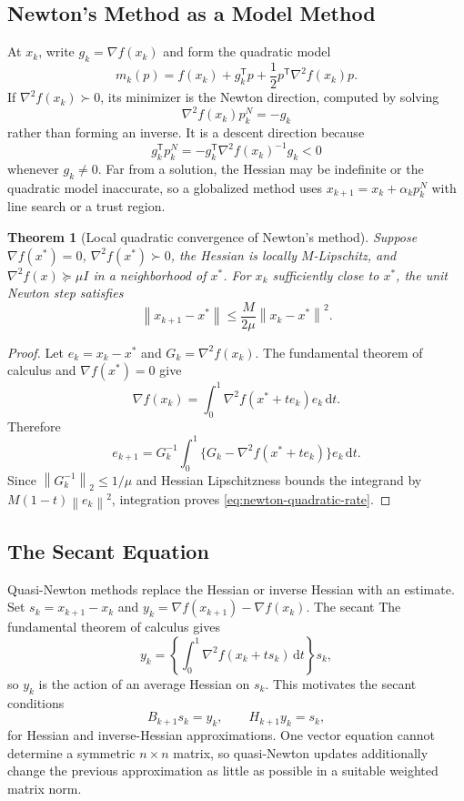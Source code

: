 \documentclass[12pt,oneside]{book}
\numberwithin{equation}{section}
\theoremstyle{definition}
\theoremstyle{plain}
\newtheorem{theorem}{Theorem}[section]
\theoremstyle{remark}
\newcommand{\norm}[1]{\left\lVert #1 \right\rVert}
\newcommand{\dd}{\,\mathrm{d}}
\newcommand{\grad}{\nabla}
\newcommand{\Hess}{\nabla^2}
\begin{document}
\subsection{Newton's Method as a Model Method}

At $x_k$, write $g_k=\grad f(x_k)$ and form the quadratic model
\[
 m_k(p)=f(x_k)+g_k^\mathsf Tp+\frac12p^\mathsf T\Hess f(x_k)p.
\]
If $\Hess f(x_k)\succ0$, its minimizer is the Newton direction, computed by
solving
\begin{equation}
 \Hess f(x_k)p_k^N=-g_k
 \label{eq:newton-system}
\end{equation}
rather than forming an inverse. It is a descent direction because
\[
 g_k^\mathsf Tp_k^N
 =-g_k^\mathsf T\Hess f(x_k)^{-1}g_k<0
\]
whenever $g_k\neq0$. Far from a solution, the Hessian may be indefinite or
the quadratic model inaccurate, so a globalized method uses
$x_{k+1}=x_k+\alpha_kp_k^N$ with line search or a trust region.

\begin{theorem}[Local quadratic convergence of Newton's method]
Suppose $\grad f(x^*)=0$, $\Hess f(x^*)\succ0$, the Hessian is locally
$M$-Lipschitz, and $\Hess f(x)\succeq\mu I$ in a neighborhood of $x^*$.
For $x_k$ sufficiently close to $x^*$, the unit Newton step satisfies
\begin{equation}
 \norm{x_{k+1}-x^*}
 \leq\frac{M}{2\mu}\norm{x_k-x^*}^2.
 \label{eq:newton-quadratic-rate}
\end{equation}
\end{theorem}

\begin{proof}
Let $e_k=x_k-x^*$ and $G_k=\Hess f(x_k)$. The fundamental theorem of calculus
and $\grad f(x^*)=0$ give
\[
 \grad f(x_k)=\int_0^1\Hess f(x^*+te_k)e_k\dd t.
\]
Therefore
\[
 e_{k+1}
 =G_k^{-1}\int_0^1
 \{G_k-\Hess f(x^*+te_k)\}e_k\dd t.
\]
Since $\norm{G_k^{-1}}_2\leq1/\mu$ and Hessian Lipschitzness bounds the
integrand by $M(1-t)\norm{e_k}^2$, integration proves
\cref{eq:newton-quadratic-rate}.
\end{proof}

\subsection{The Secant Equation}

Quasi-Newton methods replace the Hessian or inverse Hessian with an estimate.
Set $s_k=x_{k+1}-x_k$ and $y_k=\grad f(x_{k+1})-\grad f(x_k)$. The secant
The fundamental theorem of calculus gives
\begin{equation}
 y_k=\left\{\int_0^1\Hess f(x_k+ts_k)\dd t\right\}s_k,
 \label{eq:average-hessian-secant}
\end{equation}
so $y_k$ is the action of an average Hessian on $s_k$. This motivates the
secant conditions
\[
 B_{k+1}s_k=y_k,
 \qquad H_{k+1}y_k=s_k,
\]
for Hessian and inverse-Hessian approximations. One vector equation cannot
determine a symmetric $n\times n$ matrix, so quasi-Newton updates additionally
change the previous approximation as little as possible in a suitable weighted
matrix norm.
\end{document}
